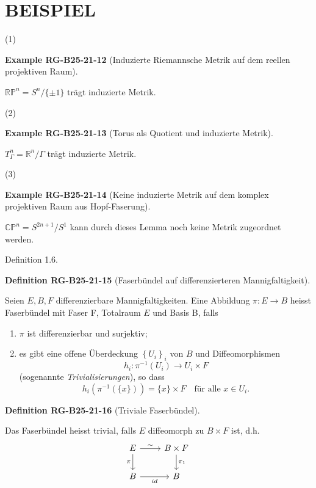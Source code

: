 \documentclass[10pt, letterpaper]{article}
\newcommand{\CustomHeading}[3]{%
  \par\medskip\noindent%
  \textbf{#1 #2} \textnormal{(#3)}.\enskip%
}
\newenvironment{DEF}[2]{\begin{unitbox}\CustomHeading{Definition}{#1}{#2}}{\end{unitbox}}
\newenvironment{EXA}[2]{\begin{unitbox}\CustomHeading{Example}{#1}{#2}}{\end{unitbox}}
\begin{document}
\section*{BEISPIEL}


(1) 

\begin{EXA}{RG-B25-21-12}{Induzierte Riemannsche Metrik auf dem reellen projektiven Raum}
$\mathbb{R} \mathbb{P}^{n}=S^{n} /\{ \pm 1\}$ trägt induzierte Metrik.
\end{EXA}


(2) 

\begin{EXA}{RG-B25-21-13}{Torus als Quotient und induzierte Metrik}
$T_{\Gamma}^{n}=\mathbb{R}^{n} / \Gamma$ trägt induzierte Metrik.
\end{EXA}


(3) 

\begin{EXA}{RG-B25-21-14}{Keine induzierte Metrik auf dem komplex projektiven Raum aus Hopf-Faserung}
$\mathbb{C P}^{n}=S^{2 n+1} / S^{1}$ kann durch dieses Lemma noch keine Metrik zugeordnet werden.
\end{EXA}



Definition 1.6. 



\begin{DEF}{RG-B25-21-15}{Faserbündel auf differenzierteren Mannigfaltigkeit}
Seien $E, B, F$ differenzierbare Mannigfaltigkeiten. Eine Abbildung $\pi: E \rightarrow B$ heisst Faserbündel mit Faser F, Totalraum $E$ und Basis B, falls
\begin{enumerate}
  \item $\pi$ ist differenzierbar und surjektiv;
  \item es gibt eine offene Überdeckung $\left\{U_{i}\right\}_{i}$ von $B$ und Diffeomorphismen
  \[
  h_{i}: \pi^{-1}(U_{i}) \rightarrow U_{i} \times F
  \]
  (sogenannte \emph{Trivialisierungen}), so dass
  \[
  h_{i}\left( \pi^{-1}(\{x\}) \right) = \{x\} \times F
  \quad \text{für alle } x \in U_i.
  \]
\end{enumerate}
\end{DEF}


\begin{DEF}{RG-B25-21-16}{Triviale Faserbündel}
Das Faserbündel heisst trivial, falls $E$ diffeomorph zu $B \times F$ ist, d.h.\\
\[
\begin{tikzcd}
E \arrow[r, "\sim"] \arrow[d, "\pi"'] & B \times F \arrow[d, "\pi_1"] \\
B \arrow[r, "id"'] & B
\end{tikzcd}
\]
\end{DEF}
\end{document}
